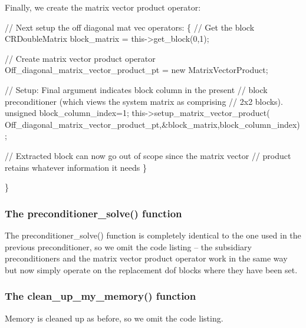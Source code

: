 Finally, we create the matrix vector product operator\+: 
\begin{DoxyCodeInclude}
  \textcolor{comment}{// Next setup the off diagonal mat vec operators:}
  \{
   \textcolor{comment}{// Get the block}
   CRDoubleMatrix block\_matrix = this->get\_block(0,1);
   
   \textcolor{comment}{// Create matrix vector product operator}
   Off\_diagonal\_matrix\_vector\_product\_pt = \textcolor{keyword}{new} MatrixVectorProduct;
   
   \textcolor{comment}{// Setup: Final argument indicates block column in the present}
   \textcolor{comment}{// block preconditioner (which views the system matrix as comprising}
   \textcolor{comment}{// 2x2 blocks).}
   \textcolor{keywordtype}{unsigned} block\_column\_index=1;
   this->setup\_matrix\_vector\_product(
   Off\_diagonal\_matrix\_vector\_product\_pt,&block\_matrix,block\_column\_index);

   \textcolor{comment}{// Extracted block can now go out of scope since the matrix vector}
   \textcolor{comment}{// product retains whatever information it needs}
  \}

 \}

\end{DoxyCodeInclude}
\hypertarget{index_two_plus_three_upper_triangular_with_replace_solve}{}\subsubsection{The preconditioner\+\_\+solve() function}\label{index_two_plus_three_upper_triangular_with_replace_solve}
The {\ttfamily preconditioner\+\_\+solve()} function is completely identical to the one used in the previous preconditioner, so we omit the code listing -- the subsidiary preconditioners and the matrix vector product operator work in the same way but now simply operate on the replacement dof blocks where they have been set.\hypertarget{index_two_plus_three_upper_triangular_with_replace_clean}{}\subsubsection{The clean\+\_\+up\+\_\+my\+\_\+memory() function}\label{index_two_plus_three_upper_triangular_with_replace_clean}
Memory is cleaned up as before, so we omit the code listing.



 

